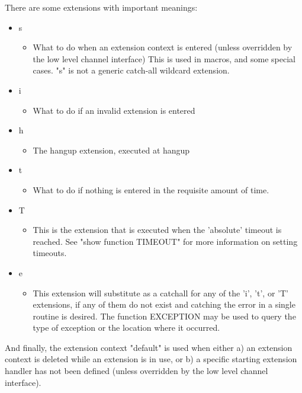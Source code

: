 There are some extensions with important meanings:

\begin{itemize}
  \item s	
  \begin{itemize}
    \item What to do when an extension context is entered (unless
          overridden by the low level channel interface)
          This is used in macros, and some special cases.
          "s" is not a generic catch-all wildcard extension.
  \end{itemize}
  \item i
  \begin{itemize}
    \item What to do if an invalid extension is entered
  \end{itemize}
  \item h
  \begin{itemize}
    \item The hangup extension, executed at hangup
  \end{itemize}
  \item t
  \begin{itemize}
    \item What to do if nothing is entered in the requisite amount
          of time.
  \end{itemize}
  \item T
  \begin{itemize}
    \item This is the extension that is executed when the 'absolute'
          timeout is reached.  See "show function TIMEOUT" for more
          information on setting timeouts.	
  \end{itemize}
  \item e
  \begin{itemize}
    \item This extension will substitute as a catchall for any of the
          'i', 't', or 'T' extensions, if any of them do not exist and
          catching the error in a single routine is desired.  The
          function EXCEPTION may be used to query the type of exception
          or the location where it occurred.
  \end{itemize}
\end{itemize}

And finally, the extension context "default" is used when either a) an
extension context is deleted while an extension is in use, or b) a specific
starting extension handler has not been defined (unless overridden by the
low level channel interface).
